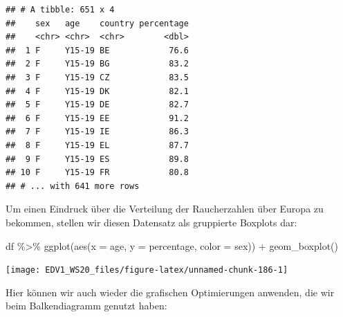 \documentclass[
]{book}
\newenvironment{Shaded}{\begin{snugshade}}{\end{snugshade}}
\newcommand{\AttributeTok}[1]{\textcolor[rgb]{0.77,0.63,0.00}{#1}}
\newcommand{\FunctionTok}[1]{\textcolor[rgb]{0.00,0.00,0.00}{#1}}
\newcommand{\NormalTok}[1]{#1}
\newcommand{\SpecialCharTok}[1]{\textcolor[rgb]{0.00,0.00,0.00}{#1}}
\begin{document}
\begin{verbatim}
## # A tibble: 651 x 4
##    sex   age    country percentage
##    <chr> <chr>  <chr>        <dbl>
##  1 F     Y15-19 BE            76.6
##  2 F     Y15-19 BG            83.2
##  3 F     Y15-19 CZ            83.5
##  4 F     Y15-19 DK            82.1
##  5 F     Y15-19 DE            82.7
##  6 F     Y15-19 EE            91.2
##  7 F     Y15-19 IE            86.3
##  8 F     Y15-19 EL            87.7
##  9 F     Y15-19 ES            89.8
## 10 F     Y15-19 FR            80.8
## # ... with 641 more rows
\end{verbatim}

Um einen Eindruck über die Verteilung der Raucherzahlen über Europa zu bekommen, stellen wir diesen Datensatz als gruppierte Boxplots dar:

\begin{Shaded}
\begin{Highlighting}[]
\NormalTok{df }\SpecialCharTok{\%\textgreater{}\%} 
  \FunctionTok{ggplot}\NormalTok{(}\FunctionTok{aes}\NormalTok{(}\AttributeTok{x =}\NormalTok{ age,}
             \AttributeTok{y =}\NormalTok{ percentage,}
             \AttributeTok{color =}\NormalTok{ sex)) }\SpecialCharTok{+}
  \FunctionTok{geom\_boxplot}\NormalTok{()}
\end{Highlighting}
\end{Shaded}

\begin{center}\texttt{[image: EDV1\_WS20\_files/figure-latex/unnamed-chunk-186-1]} \end{center}

Hier können wir auch wieder die grafischen Optimierungen anwenden, die wir beim Balkendiagramm genutzt haben:
\end{document}
